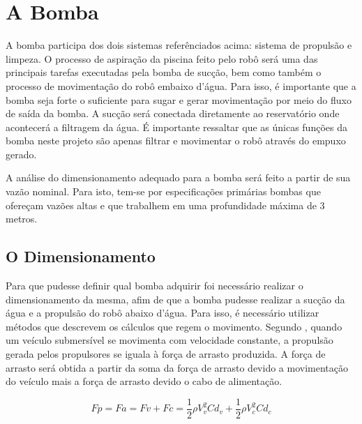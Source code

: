 \section{A Bomba}
A bomba participa dos dois sistemas referênciados acima: sistema de propulsão e limpeza. O processo de aspiração da piscina feito pelo robô será uma das principais tarefas executadas pela bomba de sucção, bem como também o processo de movimentação do robô embaixo d’água. Para isso, é importante que a bomba seja  forte o suficiente para sugar e gerar movimentação por meio do fluxo de saída da bomba. A sucção será conectada diretamente ao reservatório onde acontecerá a filtragem da água. É importante ressaltar que as únicas funções da bomba neste projeto são apenas filtrar e movimentar o robô através do empuxo gerado.

A análise do dimensionamento adequado para a bomba será feito a partir de sua vazão nominal. Para isto, tem-se por especificações primárias bombas que ofereçam vazões altas e que trabalhem em uma profundidade máxima de 3 metros.

\subsection{O Dimensionamento}
Para que pudesse definir qual bomba adquirir foi necessário realizar o dimensionamento da mesma, afim de que a bomba pudesse realizar a sucção da água e a  propulsão do robô abaixo d’água. Para isso, é necessário utilizar métodos que descrevem os cálculos que regem o movimento. Segundo
, quando um veículo submersível se movimenta com velocidade constante,
a propulsão gerada pelos propulsores se iguala à força de arrasto produzida. A
força de arrasto será obtida a partir da soma da força de arrasto devido a
movimentação do veículo mais a força de arrasto devido o cabo de alimentação.

\begin{equation} \label{eq:force-propulsion}
  Fp = Fa = Fv + Fc = \frac{1}{2}\rho V^{2}_{v}Cd_{v} + \frac{1}{2}\rho V^{2}_{c}Cd_{c}
\end{equation}

